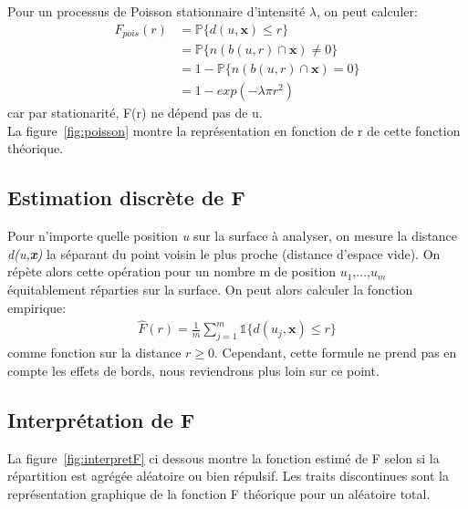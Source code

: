 \documentclass[stage2a]{tnreport}
\begin{document}
Pour un processus de Poisson stationnaire d'intensité \begin{math}\lambda\end{math}, on peut calculer:
\begin{align*}
F_{pois}(r) &= \mathbb{P}\{d(u,\textbf{x}) \leq r\} \\
            &= \mathbb{P}\{n( b(u,r) \cap \textbf{x} ) \neq 0\} \\
            &= 1 - \mathbb{P}\{ n( b(u,r) \cap \textbf{x} ) = 0\} \\
            &= 1 - exp(-\lambda \pi r^2)
\end{align*}
car par stationarité, F(r) ne dépend pas de u.\\
La figure~\ref{fig:poisson} montre la représentation en fonction de r de cette fonction théorique.\\



\subsection{Estimation discrète de F}

Pour n'importe quelle position \textit{u} sur la surface à analyser, on mesure la distance \textit{d(u,\textbf{x})} la séparant du point voisin le plus proche (distance d'espace vide). On répète alors cette opération pour un nombre m de position \begin{math}u_1\end{math},...,\begin{math}u_m\end{math} équitablement réparties sur la surface. On peut alors calculer la fonction empirique:
\begin{align*} \hat{F}(r) = \frac{1}{m}\sum_{j=1}^m \mathds{1} \{d(u_j,\textbf{x}) \leq r \}\end{align*}
comme fonction sur la distance \begin{math} r \geq 0 \end{math}. Cependant, cette formule ne prend pas en compte les effets de bords, nous reviendrons plus loin sur ce point.


\subsection*{Interprétation de F}
La figure~\ref{fig:interpretF} ci dessous montre la fonction estimé de F selon si la répartition est agrégée aléatoire ou bien répulsif. Les traits discontinues sont la représentation graphique de la fonction F théorique pour un aléatoire total.
\end{document}
